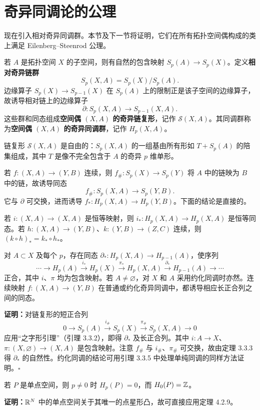 \section{奇异同调论的公理}
现在引入相对奇异同调群。本节及下一节将证明，它们在所有拓扑空间偶构成的类上满足 Eilenberg--Steenrod 公理。

若 $A$ 是拓扑空间 $X$ 的子空间，则有自然的包含映射 $S_p(A)\to S_p(X)$。定义\textbf{相对奇异链群}
\[
S_p(X,A)=S_p(X)/S_p(A).
\]
边缘算子 $S_p(X)\to S_{p-1}(X)$ 在 $S_p(A)$ 上的限制正是该子空间的边缘算子，故诱导相对链上的边缘算子
\[
\partial:S_p(X,A)\to S_{p-1}(X,A).
\]
这些群和同态组成\textbf{空间偶 $(X,A)$ 的奇异链复形}，记作 $\mathcal S(X,A)$。其同调群称为\textbf{空间偶 $(X,A)$ 的奇异同调群}，记作 $H_p(X,A)$。

链复形 $\mathcal S(X,A)$ 是自由的：$S_p(X,A)$ 的一组基由所有形如 $T+S_p(A)$ 的陪集组成，其中 $T$ 是像不完全包含于 $A$ 的奇异 $p$ 维单形。

若 $f:(X,A)\to(Y,B)$ 连续，则 $f_\#:S_p(X)\to S_p(Y)$ 将 $A$ 中的链映为 $B$ 中的链，故诱导同态
\[
f_\#:S_p(X,A)\to S_p(Y,B).
\]
它与 $\partial$ 可交换，进而诱导 $f_*:H_p(X,A)\to H_p(Y,B)$。下面的结论是直接的。

若 $i:(X,A)\to(X,A)$ 是恒等映射，则 $i_*:H_p(X,A)\to H_p(X,A)$ 是恒等同态。若 $h:(X,A)\to(Y,B)$、$k:(Y,B)\to(Z,C)$ 连续，则 $(k\circ h)_*=k_*\circ h_*$。

对 $A\subset X$ 及每个 $p$，存在同态 $\partial_*:H_p(X,A)\to H_{p-1}(A)$，使序列
\[
\cdots\longrightarrow H_p(A)\xrightarrow{i_*}H_p(X)\xrightarrow{\pi_*}H_p(X,A)\xrightarrow{\partial_*}H_{p-1}(A)\longrightarrow\cdots
\]
正合，其中 $i$、$\pi$ 均为包含映射。若 $A\ne\varnothing$，对 $X$ 和 $A$ 采用约化同调时亦然。连续映射 $f:(X,A)\to(Y,B)$ 在普通或约化奇异同调中，都诱导相应长正合列之间的同态。

\textbf{证明：}对链复形的短正合列
\[
0\longrightarrow S_p(A)\xrightarrow{i_\#}S_p(X)\xrightarrow{\pi_\#}S_p(X,A)\longrightarrow0
\]
应用“之字形引理”（引理 3.3.2），即得 $\partial_*$ 及长正合列。其中 $i:A\to X$、$\pi:(X,\varnothing)\to(X,A)$ 是包含映射。注意 $f_\#$ 与 $i_\#$、$\pi_\#$ 可交换，故由定理 3.3.3 得 $\partial_*$ 的自然性。约化同调的结论可用引理 3.3.5 中处理单纯同调的同样方法证明。\hfill$\square$

若 $P$ 是单点空间，则 $p\ne0$ 时 $H_p(P)=0$，而 $H_0(P)=\mathbb{Z}$。

\textbf{证明：}$\mathbb{R}^N$ 中的单点空间关于其唯一的点星形凸，故可直接应用定理 4.2.9。

